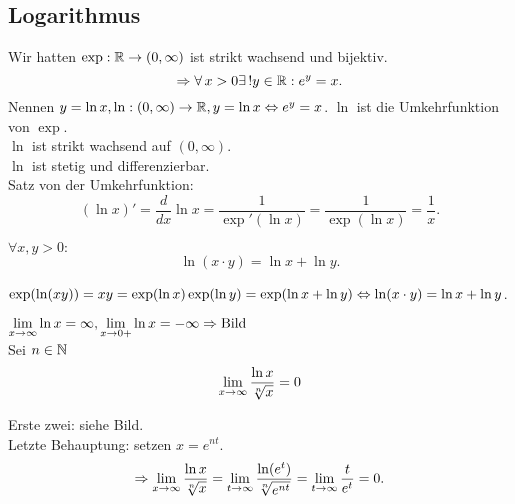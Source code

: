 \documentclass[../ana2.tex]{subfiles}
\begin{document}
\subsection*{Logarithmus}
Wir hatten \( \exp:\mathbb{R}\rightarrow (0,\infty) \) ist strikt 
wachsend und bijektiv.
\[ \Rightarrow \forall x > 0 \existse y \in \R: e^y = x. \]
Nennen \( y = \ln x, \ln:(0,\infty)\rightarrow \mathbb{R}, 
y = \ln x \Leftrightarrow e^y = x \).
\( \ln \) ist die Umkehrfunktion von \( \exp \). \\
\( \ln \) ist strikt wachsend auf \( (0,\infty) \).\\
\( \ln \) ist stetig und differenzierbar. \\
Satz von der Umkehrfunktion: 
\[ (\ln x)' = \frac{d}{dx} \ln x = \frac{1}{\exp'(\ln x)} 
= \frac{1}{\exp(\ln x)} = \frac{1}{x}. \]
\begin{satz}
    \( \forall x, y > 0: \)
    \[ \ln(x \cdot y) = \ln x + \ln y. \]
\end{satz}
\begin{bew}
    \( \exp(\ln(x y)) = x y = \exp(\ln x) \exp(\ln y) 
    = \exp(\ln x + \ln y) \\
    \Leftrightarrow \ln(x \cdot y) = \ln x + \ln y \).
\end{bew}
\begin{satz}
    \( \lim\limits_{x\rightarrow\infty} \ln x = \infty, \lim\limits_{x\rightarrow{}0+} \ln x 
    = -\infty \Rightarrow \text{Bild} \) \\
    Sei \( n \in \mathbb{N} \)
    \[ \lim\limits_{x\rightarrow\infty} \frac{\ln x}{\sqrt[n]{x}} = 0 \]
\end{satz}
\begin{bew}
    Erste zwei: siehe Bild.\\
    Letzte Behauptung: setzen \( x = e^{nt} \).
    \[ \Rightarrow \lim\limits_{x\rightarrow\infty} \frac{\ln x}{\sqrt[n]{x}} 
    = \lim\limits_{t\rightarrow\infty} \frac{\ln (e^t)}{\sqrt[n]{e^{nt}}} 
    = \lim\limits_{t\rightarrow\infty} \frac{t}{e^t} = 0. \]
\end{bew}
\end{document}
